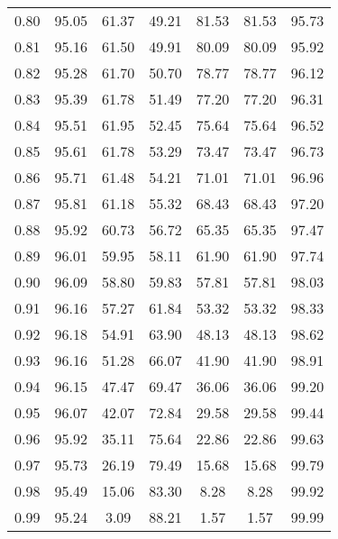 \begin{tabular}{|c|c|c|c|c|c|c|}
      0.80 &     95.05 &     61.37 &      49.21 &   81.53 &      81.53 &         95.73 \\
      0.81 &     95.16 &     61.50 &      49.91 &   80.09 &      80.09 &         95.92 \\
      0.82 &     95.28 &     61.70 &      50.70 &   78.77 &      78.77 &         96.12 \\
      0.83 &     95.39 &     61.78 &      51.49 &   77.20 &      77.20 &         96.31 \\
      0.84 &     95.51 &     61.95 &      52.45 &   75.64 &      75.64 &         96.52 \\
      0.85 &     95.61 &     61.78 &      53.29 &   73.47 &      73.47 &         96.73 \\
      0.86 &     95.71 &     61.48 &      54.21 &   71.01 &      71.01 &         96.96 \\
      0.87 &     95.81 &     61.18 &      55.32 &   68.43 &      68.43 &         97.20 \\
      0.88 &     95.92 &     60.73 &      56.72 &   65.35 &      65.35 &         97.47 \\
      0.89 &     96.01 &     59.95 &      58.11 &   61.90 &      61.90 &         97.74 \\
      0.90 &     96.09 &     58.80 &      59.83 &   57.81 &      57.81 &         98.03 \\
      0.91 &     96.16 &     57.27 &      61.84 &   53.32 &      53.32 &         98.33 \\
      0.92 &     96.18 &     54.91 &      63.90 &   48.13 &      48.13 &         98.62 \\
      0.93 &     96.16 &     51.28 &      66.07 &   41.90 &      41.90 &         98.91 \\
      0.94 &     96.15 &     47.47 &      69.47 &   36.06 &      36.06 &         99.20 \\
      0.95 &     96.07 &     42.07 &      72.84 &   29.58 &      29.58 &         99.44 \\
      0.96 &     95.92 &     35.11 &      75.64 &   22.86 &      22.86 &         99.63 \\
      0.97 &     95.73 &     26.19 &      79.49 &   15.68 &      15.68 &         99.79 \\
      0.98 &     95.49 &     15.06 &      83.30 &    8.28 &       8.28 &         99.92 \\
      0.99 &     95.24 &      3.09 &      88.21 &    1.57 &       1.57 &         99.99 \\
\bottomrule
\end{tabular}
